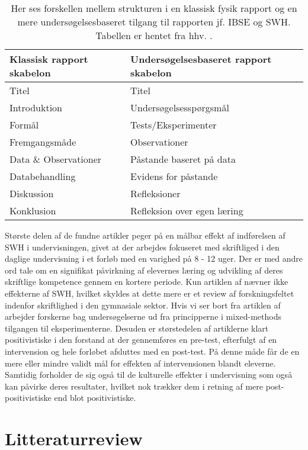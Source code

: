 \begin{table}
	\centering
	\caption{ Her ses forskellen mellem strukturen i en klassisk fysik rapport og en mere undersøgelsesbaseret tilgang til rapporten jf. IBSE og SWH. Tabellen er hentet fra hhv. 
	\citet{Burke2005, Keys1999}.}
	\label{tbl:2.1}
	\begin{tabular}{@{ } l l @{ }}
		\toprule[2.5pt]
			Klassisk rapport  skabelon & Undersøgelsesbaseret rapport skabelon\\
		\midrule[1.25pt]
			Titel				&	Titel\\
			Introduktion			&	Undersøgelsesspørgsmål\\
			Formål			& 	Tests/Eksperimenter\\
			Fremgangsmåde		&	Observationer\\
			Data \& Observationer	&	Påstande baseret på data\\
			Databehandling		&	Evidens for påstande\\
			Diskussion			&	Refleksioner\\
			Konklusion			&	Refleksion over egen læring\\
		\bottomrule[2.5pt]
	\end{tabular}
\end{table}

Største delen af de fundne artikler peger på en målbar effekt af indførelsen af SWH i undervisningen, givet at der arbejdes fokuseret med skriftliged i den daglige undervisning i et forløb med en varighed på 8 - 12 uger. Der er med andre ord tale om en signifikat påvirkning af elevernes læring og udvikling af deres skriftlige kompetence gennem en kortere periode. Kun artiklen af \citep{Miller2018} nævner ikke effekterne af SWH, hvilket skyldes at dette mere er et review af forskningsfeltet indenfor skriftlighed i den gymnasiale sektor. Hvis vi ser bort fra artiklen af \citep{Miller2018, Dolin2014, Krogh2016} arbejder forskerne bag undersøgelserne ud fra principperne i mixed-methods tilgangen til eksperimenterne. Desuden er størstedelen af artiklerne klart positivistiske i den forstand at der gennemføres en pre-test, efterfulgt af en intervension og hele forløbet afsluttes med en post-test. På denne måde får de en mere eller mindre validt mål for effekten af intervensionen blandt eleverne. Samtidig forholder de sig også til de kulturelle effekter i undervisning som også kan påvirke deres resultater, hvilket nok trækker dem i retning af mere post-positivistiske end blot positivistiske.


\section{Litteraturreview}
\label{sec:2.3}

